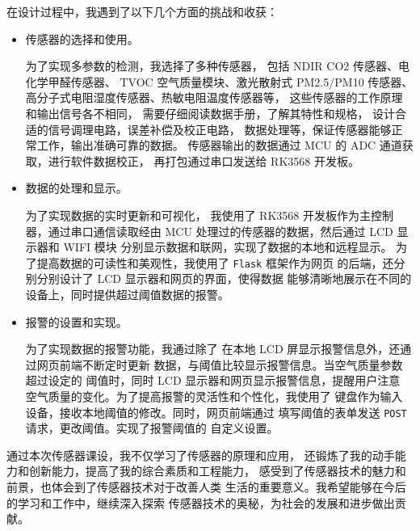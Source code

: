 \documentclass[12pt,hyperref,a4paper,UTF8]{ctexart}
\begin{document}
在设计过程中，我遇到了以下几个方面的挑战和收获：
\begin{itemize}
    \item 传感器的选择和使用。
    
        为了实现多参数的检测，我选择了多种传感器，
        包括 NDIR CO2 传感器、电化学甲醛传感器、
        TVOC 空气质量模块、激光散射式 PM2.5/PM10 传感器、
        高分子式电阻湿度传感器、热敏电阻温度传感器等，
        这些传感器的工作原理和输出信号各不相同，
        需要仔细阅读数据手册，了解其特性和规格，
        设计合适的信号调理电路，误差补偿及校正电路，
        数据处理等，保证传感器能够正常工作，输出准确可靠的数据。
        传感器输出的数据通过 MCU 的 ADC 通道获取，进行软件数据校正，
        再打包通过串口发送给 RK3568 开发板。
    \item 数据的处理和显示。
        
        为了实现数据的实时更新和可视化，
        我使用了 RK3568 开发板作为主控制器，通过串口通信读取经由
         MCU 处理过的传感器的数据，然后通过 LCD 显示器和 WIFI 模块
        分别显示数据和联网，实现了数据的本地和远程显示。
        为了提高数据的可读性和美观性，我使用了 \texttt{Flask} 框架作为网页
        的后端，还分别分别设计了 LCD 显示器和网页的界面，使得数据
        能够清晰地展示在不同的设备上，同时提供超过阈值数据的报警。
    \item 报警的设置和实现。
        
        为了实现数据的报警功能，我通过除了
        在本地 LCD 屏显示报警信息外，还通过网页前端不断定时更新
        数据，与阈值比较显示报警信息。当空气质量参数超过设定的
        阈值时，同时 LCD 显示器和网页显示报警信息，提醒用户注意
        空气质量的变化。为了提高报警的灵活性和个性化，我使用了
        键盘作为输入设备，接收本地阈值的修改。同时，网页前端通过
        填写阈值的表单发送 \texttt{POST} 请求，更改阈值。实现了报警阈值的
        自定义设置。
\end{itemize}

通过本次传感器课设，我不仅学习了传感器的原理和应用，
还锻炼了我的动手能力和创新能力，提高了我的综合素质和工程能力，
感受到了传感器技术的魅力和前景，也体会到了传感器技术对于改善人类
生活的重要意义。我希望能够在今后的学习和工作中，继续深入探索
传感器技术的奥秘，为社会的发展和进步做出贡献。
{} 
\end{document}
